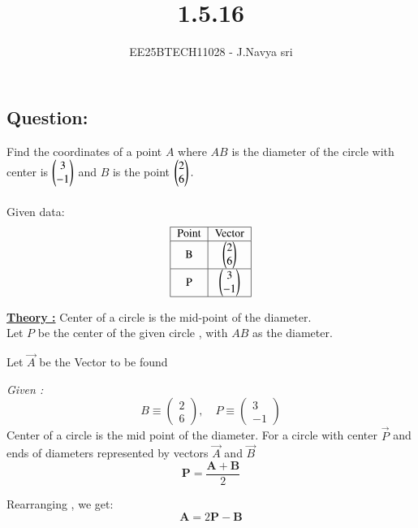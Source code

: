 \documentclass[journal]{IEEEtran}
\numberwithin{equation}{enumi}
\numberwithin{figure}{enumi}
\begin{document}

\vspace{3cm}

\title{1.5.16}
\author{EE25BTECH11028 - J.Navya sri}
\maketitle

\subsection*{\textbf{Question:} } 
Find the coordinates of a point $A$ where $AB$ is the diameter of the circle with center is $\begin{pmatrix}3\\-1 \end{pmatrix}$ and $B$ is the point $\begin{pmatrix}2\\6\end{pmatrix}.$\\
\solution \\ 
Given data:
\[
\begin{tabular}[12pt]{ |c| c| c|} 
    \hline
    {Point} & {Vector} \\ 
    \hline
    B & $ \myvec{2 \\ 6} $  \\
    \hline
     P & $ \myvec{3 \\ -1} $   \\
    \hline  
    \end{tabular}
\]

\underline{\textbf{Theory :}} Center of a circle is the mid-point of the diameter. \\

Let $P$ be the center of the given circle , with $AB$ as the diameter.

Let $\vec{A}$ be the Vector to be found 

\textit{Given :} 
\[
B \equiv \begin{pmatrix} 2 \\ 6 \end{pmatrix}, \quad P \equiv \begin{pmatrix} 3 \\ -1 \end{pmatrix}
\]
Center of a circle is the mid point of the diameter. For a circle with center $\vec{P}$ and ends of diameters represented by vectors $\vec{A}$ and $\vec{B}$  
\[
\mathbf{P} = \frac{\mathbf{A} + \mathbf{B}}{2} \tag{0.1}
\]

Rearranging , we get:
\[
\mathbf{A} = 2\mathbf{P} - \mathbf{B} \tag{0.2}
\]
\end{document}
